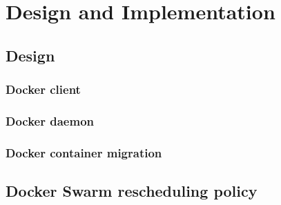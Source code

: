 \chapter{Design and Implementation}
\label{chap:design}
\section{Design}

\subsection{Docker client}

\subsection{Docker daemon}

\subsection{Docker container migration}

\section{Docker Swarm rescheduling policy}
